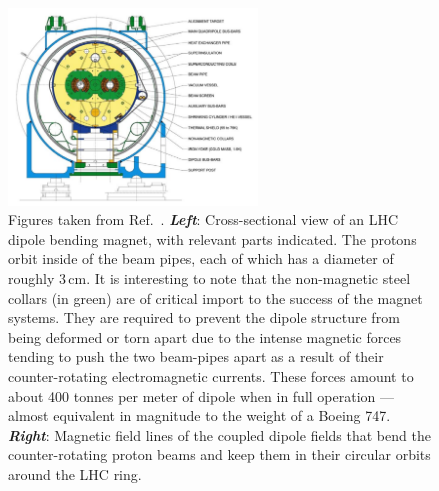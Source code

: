 \begin{figure}[!htb]
    \begin{center}
        \begin{minipage}{\textwidth}
        \includegraphics[width=0.59\textwidth]{figures/chapter2/lhc_dipole_fig3p3}
        \end{minipage}
        \caption{
            Figures taken from Ref.~\cite{LHCMachine,TheLHCOverview}.
            \textbf{\textit{Left}}: Cross-sectional view of an LHC dipole bending magnet, with relevant parts indicated.
            The protons orbit inside of the beam pipes, each of which has a diameter of roughly $3$\,cm.
            It is interesting to note that the non-magnetic steel collars (in green) are of critical import
            to the success of the magnet systems. They are required
            to prevent the dipole structure from being deformed or torn apart due to the intense magnetic forces
            tending to push the two beam-pipes apart as a result of their counter-rotating electromagnetic currents.
            These forces amount to about 400 tonnes per meter of dipole when in full operation --- almost equivalent in magnitude
            to the weight of a Boeing 747.
            \textbf{\textit{Right}}: Magnetic field lines of the coupled dipole fields that bend the counter-rotating proton beams
            and keep them in their circular orbits around the LHC ring.
        }
        \label{fig:lhc_dipole_xsec}
    \end{center}
\end{figure}

